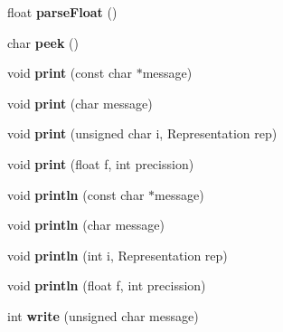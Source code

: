 \begin{DoxyCompactItemize}
\item 
\hypertarget{class_serial_pi_a2582f1373feeda9525a6872132b54947}{}float {\bfseries parse\+Float} ()\label{class_serial_pi_a2582f1373feeda9525a6872132b54947}

\item 
\hypertarget{class_serial_pi_a324beb8730c1d525d5f3634285280f7f}{}char {\bfseries peek} ()\label{class_serial_pi_a324beb8730c1d525d5f3634285280f7f}

\item 
\hypertarget{class_serial_pi_a1ddda5bacb55e5b7e0738a933c01552c}{}void {\bfseries print} (const char $\ast$message)\label{class_serial_pi_a1ddda5bacb55e5b7e0738a933c01552c}

\item 
\hypertarget{class_serial_pi_a292f2efcdb9399349f30f81eadcfd8f6}{}void {\bfseries print} (char message)\label{class_serial_pi_a292f2efcdb9399349f30f81eadcfd8f6}

\item 
\hypertarget{class_serial_pi_a80e6de262f7785c64a60de77e63ea062}{}void {\bfseries print} (unsigned char i, Representation rep)\label{class_serial_pi_a80e6de262f7785c64a60de77e63ea062}

\item 
\hypertarget{class_serial_pi_a67b7b1e93400f3591c1a66fcdb38153d}{}void {\bfseries print} (float f, int precission)\label{class_serial_pi_a67b7b1e93400f3591c1a66fcdb38153d}

\item 
\hypertarget{class_serial_pi_a85ed4e5ac4ffbb77fa688abf822da712}{}void {\bfseries println} (const char $\ast$message)\label{class_serial_pi_a85ed4e5ac4ffbb77fa688abf822da712}

\item 
\hypertarget{class_serial_pi_ab9640e4b123be763757feed4b9275394}{}void {\bfseries println} (char message)\label{class_serial_pi_ab9640e4b123be763757feed4b9275394}

\item 
\hypertarget{class_serial_pi_a5bc430dd6da56173c0055a6f70dba87d}{}void {\bfseries println} (int i, Representation rep)\label{class_serial_pi_a5bc430dd6da56173c0055a6f70dba87d}

\item 
\hypertarget{class_serial_pi_ab5914e90a679ec4c708b847c754d2bc3}{}void {\bfseries println} (float f, int precission)\label{class_serial_pi_ab5914e90a679ec4c708b847c754d2bc3}

\item 
\hypertarget{class_serial_pi_a230ca72a6b942346b32536fa6f2dc896}{}int {\bfseries write} (unsigned char message)\label{class_serial_pi_a230ca72a6b942346b32536fa6f2dc896}


\end{DoxyCompactItemize}
